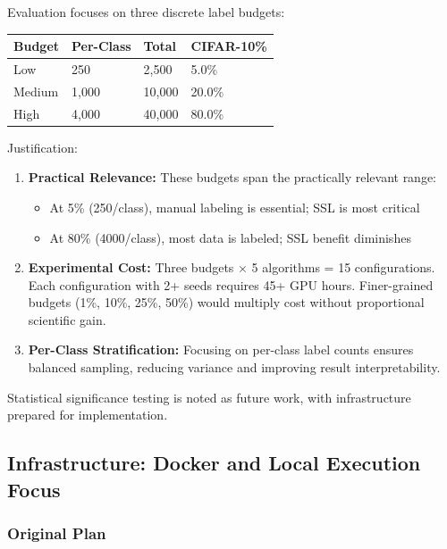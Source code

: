 Evaluation focuses on three discrete label budgets:

\begin{center}
\small
\begin{tabular}{|l|l|l|l|}
\hline
\textbf{Budget} & \textbf{Per-Class} & \textbf{Total} & \textbf{CIFAR-10}\%\\
\hline
Low & 250 & 2,500 & 5.0\% \\
Medium & 1,000 & 10,000 & 20.0\% \\
High & 4,000 & 40,000 & 80.0\% \\
\hline
\end{tabular}
\end{center}

Justification:

\begin{enumerate}
    \item \textbf{Practical Relevance:} These budgets span the practically relevant range:
        \begin{itemize}
            \item At 5\% (250/class), manual labeling is essential; SSL is most critical
            \item At 80\% (4000/class), most data is labeled; SSL benefit diminishes
        \end{itemize}

    \item \textbf{Experimental Cost:} Three budgets $\times$ 5 algorithms = 15 configurations. Each configuration with 2+ seeds requires 45+ GPU hours. Finer-grained budgets (1\%, 10\%, 25\%, 50\%) would multiply cost without proportional scientific gain.

    \item \textbf{Per-Class Stratification:} Focusing on per-class label counts ensures balanced sampling, reducing variance and improving result interpretability.
\end{enumerate}

Statistical significance testing is noted as future work, with infrastructure prepared for implementation.

\subsection{Infrastructure: Docker and Local Execution Focus}

\subsubsection{Original Plan}

